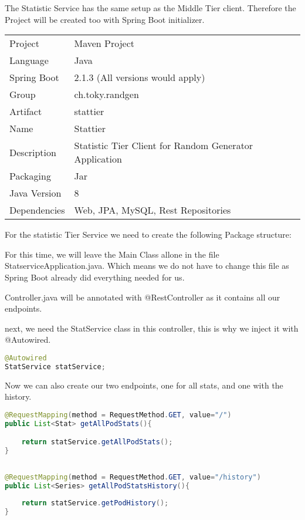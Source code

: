 The Statistic Service has the same setup as the Middle Tier client.
Therefore the Project will be created too with Spring Boot initializer.
\begin{tabbing}
\begin{tabular}{ll}
Project & Maven Project \\
Language & Java \\
Spring Boot & 2.1.3 (All versions would apply) \\
Group & ch.toky.randgen \\
Artifact & stattier \\
Name & Stattier \\
Description & Statistic Tier Client for Random Generator Application \\
Packaging & Jar \\
Java Version & 8 \\
Dependencies & Web, JPA, MySQL, Rest Repositories
\end{tabular}
\end{tabbing}

For the statistic Tier Service we need to create the following Package structure:

For this time, we will leave the Main Class allone in the file StatserviceApplication.java. Which means we do not have to change this file as Spring Boot already did everything needed for us.

Controller.java will be annotated with @RestController as it contains all our endpoints.

next, we need the StatService class in this controller, this is why we inject it with @Autowired.
\begin{lstlisting}[language=Java]
@Autowired
StatService statService;
\end{lstlisting}

Now we can also create our two endpoints, one for all stats, and one with the history.

\begin{lstlisting}[language=Java]
@RequestMapping(method = RequestMethod.GET, value="/")
public List<Stat> getAllPodStats(){

    return statService.getAllPodStats();
}
    
    
@RequestMapping(method = RequestMethod.GET, value="/history")
public List<Series> getAllPodStatsHistory(){
        
	return statService.getPodHistory();	
}
\end{lstlisting}

